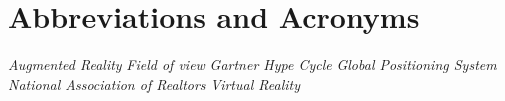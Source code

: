 \documentclass[12pt]{article}
\begin{document}
\newpage
\section*{Abbreviations and Acronyms}

\begin{acronym}[Bash]
	 {\textit{Augmented Reality}}
	 {\textit{Field of view}}
	 {\textit{Gartner Hype Cycle}}
	 {\textit{Global Positioning System}}
	 {\textit{National Association of Realtors}}
	 {\textit{Virtual Reality}}
\end{acronym}

\listoffigures


\end{document}
